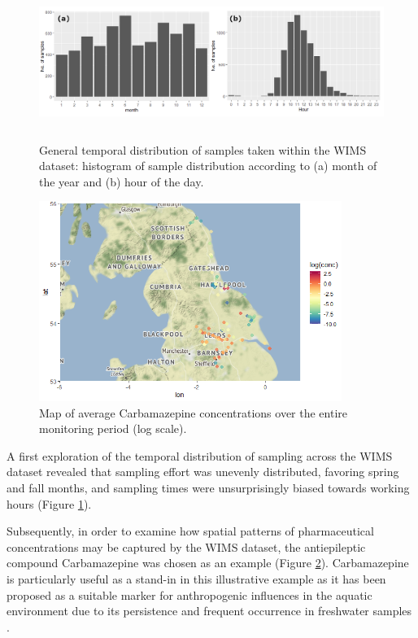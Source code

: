 \documentclass{article}
\begin{document}
\begin{figure}[h]
    \centering
    \includegraphics[height=5cm]{fig_hist.png}
    \caption{General temporal distribution of samples taken within the WIMS dataset: histogram of sample distribution according to (a) month of the year and (b) hour of the day.}
    \label{fig_general_hist}
\end{figure}
\begin{figure}[!h]
    \centering
    \includegraphics[height=6.5cm]{fig_carbamazepine_map.png}
    \caption{Map of average Carbamazepine concentrations over the entire monitoring period (log scale).}
    \label{fig_carbamazepine_map}
\end{figure}

A first exploration of the temporal distribution of sampling across the WIMS dataset revealed that sampling effort was unevenly distributed, favoring spring and fall months, and sampling times were unsurprisingly biased towards working hours (Figure \ref{fig_general_hist}).

Subsequently, in order to examine how spatial patterns of pharmaceutical concentrations may be captured by the WIMS dataset, the antiepileptic compound Carbamazepine was chosen as an example (Figure \ref{fig_carbamazepine_map}). Carbamazepine is particularly useful as a stand-in in this illustrative example as it has been proposed as a suitable marker for anthropogenic influences in the aquatic environment due to its persistence and frequent occurrence in freshwater samples \citep{Clara2004CarbamazepineInfiltration,Nakada2016AssessingNorihide}.
\end{document}
